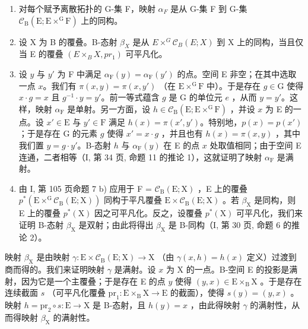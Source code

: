 \begin{enumerate}
\def\labelenumi{\alph{enumi})}
\item
  对每个赋予离散拓扑的 G-集 F，映射 \(\alpha_{F}\) 是从 G-集 F 到 G-集 \(\mathcal{C}_{\mathrm{B}}(\mathrm{E};\mathrm{E}\times^{\mathrm{G}}\mathrm{F})\) 上的同构。
\item
  设 X 为 B 的覆叠。B-态射 \(\beta_{X}\) 是从 \(E \times^{G} \mathcal{C}_{B}(E; X)\) 到 X 上的同构，当且仅当 E 的覆叠 \((E \times_{B} X, pr_{1})\) 可平凡化。
\item
  设 \(y\) 与 \(y'\) 为 F 中满足 \(\alpha_{\mathrm{F}}(y) = \alpha_{\mathrm{F}}(y')\) 的点。空间 E 非空；在其中选取一点 \(x\)。我们有 \(\pi(x, y) = \pi(x, y')\) （在 \(\mathrm{E} \times^{\mathrm{G}} \mathrm{F}\) 中）。于是存在 \(g \in \mathrm{G}\) 使得 \(x \cdot g = x\) 且 \(g^{-1} \cdot y = y'\)。前一等式蕴含 \(g\) 是 G 的单位元 \(e\) ，从而 \(y = y'\)。这样，映射 \(\alpha_{\mathrm{F}}\) 是单射。另一方面，设 \(h \in \mathcal{C}_{\mathrm{B}}(\mathrm{E}; \mathrm{E} \times^{\mathrm{G}} \mathrm{F})\) ，并设 \(x\) 为 E 的一点。设 \(x' \in \mathrm{E}\) 与 \(y' \in \mathrm{F}\) 满足 \(h(x) = \pi(x', y')\)。特别地，\(p(x) = p(x')\)；于是存在 G 的元素 \(g\) 使得 \(x' = x \cdot g\) ，并且也有 \(h(x) = \pi(x, y)\) ，其中我们置 \(y = g \cdot y'\)。B-态射 \(h\) 与 \(\alpha_{\mathrm{F}}(y)\) 在 E 的点 \(x\) 处取值相同；由于空间 E 连通，二者相等（I, 第 34 页, 命题 11 的推论 1），这就证明了映射 \(\alpha_{\mathrm{F}}\) 是满射。
\item
  由 I, 第 105 页命题 7 b) 应用于 F = \(\mathcal{C}_{\mathrm{B}}(\mathrm{E};\mathrm{X})\) ，E 上的覆叠 \(p^{*}(\mathrm{E}\times^{\mathrm{G}}\mathcal{C}_{\mathrm{B}}(\mathrm{E};\mathrm{X}))\) 同构于平凡覆叠 \(\mathrm{E}\times \mathcal{C}_{\mathrm{B}}(\mathrm{E};\mathrm{X})\) 。若 \(\beta_{\mathrm{X}}\) 是同构，则 E 上的覆叠 \(p^{*}(\mathrm{X})\) 因之可平凡化。反之，设覆叠 \(p^{*}(\mathrm{X})\) 可平凡化，我们来证明 B-态射 \(\beta_{\mathrm{X}}\) 是双射；由此将得出 \(\beta_{\mathrm{X}}\) 是 B-同构（I, 第 30 页, 命题 6 的推论 2）。
\end{enumerate}

映射 \(\beta_{\mathrm{X}}\) 是由映射 \(\gamma\colon\mathrm{E}\times\mathcal{C}_{\mathrm{B}}(\mathrm{E};\mathrm{X})\to\mathrm{X}\) （由 \(\gamma(x,h)=h(x)\) 定义）过渡到商而得的。我们来证明映射 \(\gamma\) 是满射。设 \(x\) 为 X 的一点。B-空间 E 的投影是满射，因为它是一个主覆叠；于是存在 E 的点 \(y\) 使得 \((y,x)\in\mathrm{E}\times_{\mathrm{B}}\mathrm{X}\) 。于是存在连续截面 \(s\) （可平凡化覆叠 \(\mathrm{pr}_{1}:\mathrm{E}\times_{\mathrm{B}}\mathrm{X}\to\mathrm{E}\) 的截面），使得 \(s(y)=(y,x)\) 。映射 \(h=\mathrm{pr}_{2}\circ s:\mathrm{E}\to\mathrm{X}\) 是 B-态射，且 \(h(y)=x\) ，由此得映射 \(\gamma\) 的满射性，从而得映射 \(\beta_{\mathrm{X}}\) 的满射性。

